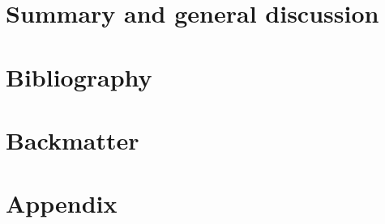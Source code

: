 \documentclass[a4paper,11pt]{article}
\numberwithin{equation}{chapter}
\numberwithin{listing}{chapter}
\begin{document}
\section{Summary and general discussion}
\label{sec:orgece04b8}


\section{Bibliography}
\label{sec:orgdbf6332}

\begingroup
\sloppy
{}
\setlength\bibitemsep{3pt}
\printbibliography
\endgroup

\section{Backmatter}
\label{sec:org2cb5aa4}

\backmatter

\section{Appendix}
\label{sec:orga6d62e3}

\appendix
\end{document}
